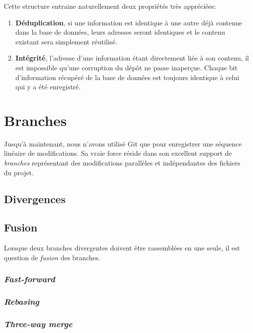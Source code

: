 \documentclass[11pt,a4paper]{article}
\begin{document}
Cette structure entraine naturellement deux propriétés très appréciées:

\begin{enumerate}
	\item \textbf{Déduplication}, 
	si une information est identique à une autre déjà contenue dans la base de données, leurs adresses seront identiques et le contenu existant sera simplement réutilisé.
	
	\item \textbf{Intégrité},
	l'adresse d'une information étant directement liée à son contenu, il est impossible qu'une corruption du dépôt ne passe inaperçue.
	Chaque bit d'information récupéré de la base de données est toujours identique à celui qui y a été enregistré.
\end{enumerate}

\section{Branches}

Jusqu'à maintenant, nous n'avons utilisé Git que pour enregistrer une séquence linéaire de modifications. Sa vraie force réside dans son excellent support de \textit{branches} représentant des modifications parallèles et indépendantes des fichiers du projet.

\subsection{Divergences}

\subsection{Fusion}

Lorsque deux branches divergentes doivent être rassemblées en une seule, il est question de \textit{fusion} des branches.

\subsubsection{\textit{Fast-forward}}

\subsubsection{\textit{Rebasing}}

\subsubsection{\textit{Three-way merge}}
\end{document}
